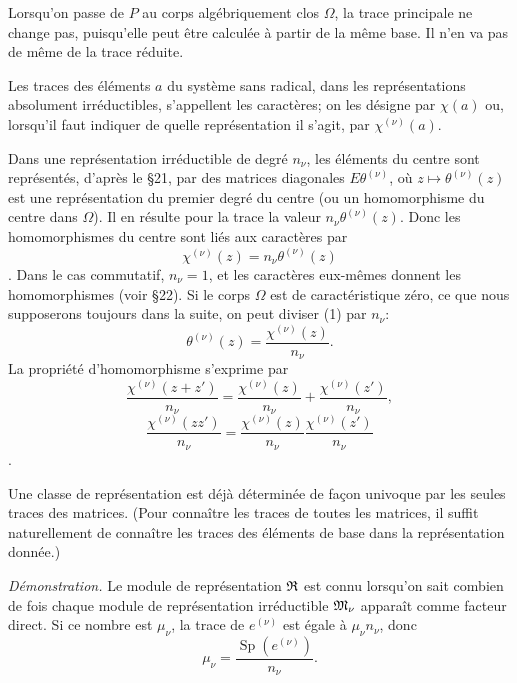 Lorsqu'on passe de $P$ au corps algébriquement clos $\Omega$, la trace principale ne change pas, puisqu'elle peut être calculée à partir de la même base. Il n'en va pas de même de la trace réduite.

Les traces des éléments $a$ du système sans radical, dans les représentations absolument irréductibles, s'appellent les caractères; on les désigne par $\chi(a)$ ou, lorsqu'il faut indiquer de quelle représentation il s'agit, par $\chi^{(\nu)}(a)$.

Dans une représentation irréductible de degré $n_\nu$, les éléments du centre sont représentés, d'après le \S{}21, par des matrices diagonales $E\theta^{(\nu)}$, où $z\mapsto\theta^{(\nu)}(z)$ est une représentation du premier degré du centre (ou un homomorphisme du centre dans $\Omega$). Il en résulte pour la trace la valeur $n_\nu\theta^{(\nu)}(z)$. Donc les homomorphismes du centre sont liés aux caractères par
\[
        \chi^{(\nu)}(z)=n_\nu\theta^{(\nu)}(z)                 \tag{1}
\].
Dans le cas commutatif, $n_\nu=1$, et les caractères eux-mêmes donnent les homomorphismes (voir \S{}22). Si le corps $\Omega$ est de caractéristique zéro, ce que nous supposerons toujours dans la suite, on peut diviser (1) par $n_\nu$:
\[
        \theta^{(\nu)}(z)=\frac{\chi^{(\nu)}(z)}{n_\nu}.
\]
La propriété d'homomorphisme s'exprime par
\[
        \frac{\chi^{(\nu)}(z+z')}{n_\nu}
        =\frac{\chi^{(\nu)}(z)}{n_\nu}+\frac{\chi^{(\nu)}(z')}{n_\nu},
\]
\[
        \frac{\chi^{(\nu)}(zz')}{n_\nu}
        =\frac{\chi^{(\nu)}(z)}{n_\nu}\frac{\chi^{(\nu)}(z')}{n_\nu}
\].

Une classe de représentation est déjà déterminée de façon univoque par les seules traces des matrices. (Pour connaître les traces de toutes les matrices, il suffit naturellement de connaître les traces des éléments de base dans la représentation donnée.)

\emph{Démonstration.} Le module de représentation $\mathfrak{R}$ est connu lorsqu'on sait combien de fois chaque module de représentation irréductible $\mathfrak{M}_\nu$ apparaît comme facteur direct. Si ce nombre est $\mu_\nu$, la trace de $e^{(\nu)}$ est égale à $\mu_\nu n_\nu$, donc
\[
        \mu_\nu=\frac{\operatorname{Sp}(e^{(\nu)})}{n_\nu}.
\]
